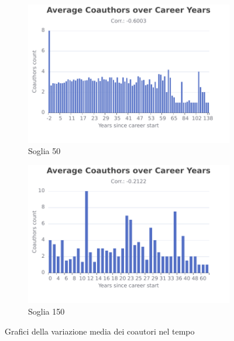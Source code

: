 \begin{figure}[ht]
    \centering
    \begin{subfigure}{0.49\textwidth}
        \includegraphics[width=\textwidth]{images/Average-Coauthors-over-Career-Years-50.pdf}
        \caption{Soglia 50}
        \label{fig:Average-Coauthors-over-Career-Years-50}
    \end{subfigure}
    \hfill
    \begin{subfigure}{0.49\textwidth}
        \includegraphics[width=\textwidth]{images/Average-Coauthors-over-Career-Years-150.pdf}
        \caption{Soglia 150}
        \label{fig:Average-Coauthors-over-Career-Years-150}
    \end{subfigure}        
    \caption{Grafici della variazione media dei coautori nel tempo}
    \label{fig:Average-Coauthors-over-Career-Years}
\end{figure}

